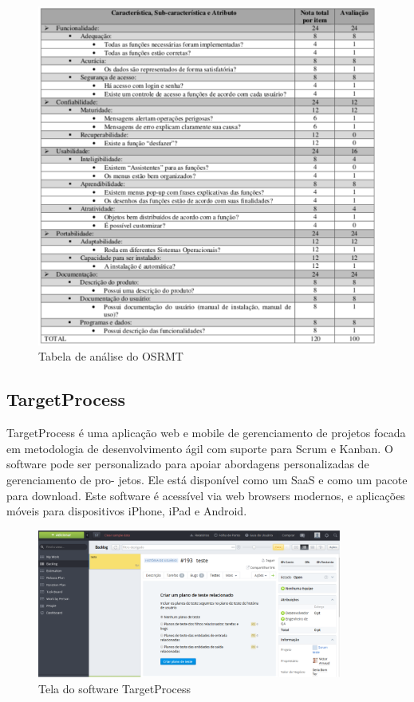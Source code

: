   \begin{figure}[!h]
    \centering
    \includegraphics[width=12cm, keepaspectratio=true]{figuras/ferramentas/osrmt2.eps}
    \caption{Tabela de análise do OSRMT}
  \end{figure}

\subsection{TargetProcess}

  TargetProcess é uma aplicação web e mobile de gerenciamento de projetos focada
  em metodologia de desenvolvimento ágil com suporte para Scrum e Kanban. O software
  pode ser personalizado para apoiar abordagens personalizadas de gerenciamento de pro-
  jetos. Ele está disponível como um SaaS e como um pacote para download. Este software
  é acessível via web browsers modernos, e aplicações móveis para dispositivos
  iPhone, iPad e Android.

  \begin{figure}[!h]
    \centering
    \includegraphics[width=10cm, keepaspectratio=true]{figuras/ferramentas/target1.eps}
    \caption{Tela do software TargetProcess}
  \end{figure}

